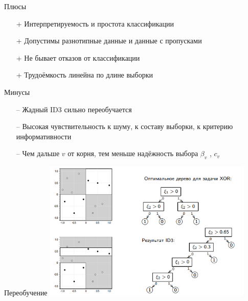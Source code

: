 \documentclass[10pt]{beamer}
\begin{document}
\begin{frame}{Плюсы}
	\begin{enumerate}[<+- |alert@+>] 
	\item[+] Интерпретируемость и простота классификации
	\item[+] Допустимы разнотипные данные и данные с пропусками
	\item[+] Не бывает отказов от классификации
	\item[+] Трудоёмкость линейна по длине выборки
	\end{enumerate}
\end{frame}

\begin{frame}{Минусы}
	\begin{enumerate} [<+- |alert@+>] 
	\item[--] Жадный ID3 сильно переобучается
	\item[--] Высокая чувствительность к шуму, к составу выборки, к критерию информативности
	\item[--] Чем дальше $v$ от корня, тем меньше надёжность выбора $\beta_v$ , $c_v$
	\end{enumerate}
\end{frame}

\begin{frame}{Переобучение}
  \includegraphics[height=190pt, keepaspectratio = true]{images/overfitting}   
\end{frame}
\end{document}
